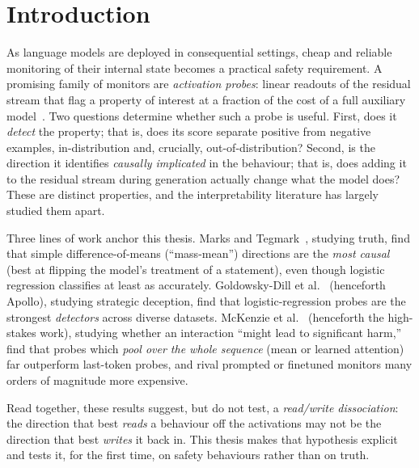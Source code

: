 \documentclass[conference]{IEEEtran}
\begin{document}
\section{Introduction}

As language models are deployed in consequential settings, cheap and reliable
monitoring of their internal state becomes a practical safety requirement.
A promising family of monitors are \emph{activation probes}: linear readouts
of the residual stream that flag a property of interest at a fraction of the
cost of a full auxiliary model~\cite{alain2018,mckenzie2025}. Two questions
determine whether such a probe is useful. First, does it \emph{detect} the
property; that is, does its score separate positive from negative examples,
in-distribution and, crucially, out-of-distribution? Second, is the direction
it identifies \emph{causally implicated} in the behaviour; that is, does adding
it to the residual stream during generation actually change what the model does?
These are distinct properties, and the interpretability literature has largely
studied them apart.

Three lines of work anchor this thesis. Marks and Tegmark~\cite{marks2024},
studying truth, find that simple difference-of-means (``mass-mean'') directions
are the \emph{most causal} (best at flipping the model's treatment of a
statement), even though logistic regression classifies at least as accurately.
Goldowsky-Dill et al.~\cite{goldowsky2025} (henceforth Apollo), studying
strategic deception, find that logistic-regression probes are the strongest
\emph{detectors} across diverse datasets. McKenzie et al.~\cite{mckenzie2025}
(henceforth the high-stakes work), studying whether an interaction ``might lead
to significant harm,'' find that probes which \emph{pool over the whole
sequence} (mean or learned attention) far outperform last-token probes, and
rival prompted or finetuned monitors many orders of magnitude more expensive.

Read together, these results suggest, but do not test, a \emph{read/write
dissociation}: the direction that best \emph{reads} a behaviour off the
activations may not be the direction that best \emph{writes} it back in. This
thesis makes that hypothesis explicit and tests it, for the first time, on
safety behaviours rather than on truth.
\end{document}
